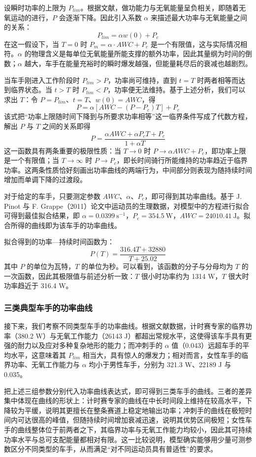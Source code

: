 \documentclass[11pt,a4paper]{ctexart}
\begin{document}
设瞬时功率的上限为 $P_{lim}$。根据文献，做功能力与无氧能量呈负相关，即随着无氧运动的进行，$P$ 会逐渐下降。因此引入系数 $\alpha$ 来描述最大功率与无氧能量之间的关系：
\[
P_{lim}=\alpha w(0)+P_c
\]
在这一假设下，当 $T=0$ 时 $P_m=\alpha \cdot AWC+P_c$ 是一个有限值，这与实际情况相符。$\alpha$ 的物理含义是每单位无氧能量所能支撑的额外功率，因此其量纲为时间的倒数；$\alpha$ 越大，车手在能量充裕时的瞬时爆发越强，但能量耗尽后的衰减也越剧烈。

当车手刚进入工作阶段时 $P_{lim}>P$，功率尚可维持，直到 $t=T$ 时两者相等而达到临界状态。当 $t>T$ 时 $P_{lim}<P$，功率便无法维持。基于上述分析，我们可以求出 $T$：令 $P=P_{lim}$、$t=T$、$w(0)=AWC$，得
\[
P=\alpha\left[AWC-(P-P_c)T\right]+P_c
\]
该式把“功率上限随时间下降到与所要求功率相等”这一临界条件写成了代数方程，解出 $P$ 与 $T$ 之间的关系即得
\[
P=\frac{\alpha AWC+\alpha P_c T+P_c}{1+\alpha T}
\]
这一函数具有两条重要的极限性质：当 $T\to 0$ 时 $P\to \alpha AWC+P_c$，即功率上限是一个有限值；当 $T\to\infty$ 时 $P\to P_c$，即长时间骑行所能维持的功率趋近于临界功率。这两条性质恰好刻画出功率曲线的两端行为，中间部分则表现为随持续时间增加而单调下降的过渡段。

对于给定的车手，只要测定参数 $AWC$、$\alpha$、$P_c$，即可得到其功率曲线。基于 J. Pinot 与 F. Grappe（2011）论文中运动员的生理数据，对模型中的方程进行拟合可得到最佳拟合结果，即 $\alpha=0.0399\ \mathrm{s^{-1}}$，$P_c=354.5\ \mathrm{W}$，$AWC=24010.41\ \mathrm{J}$。拟合所得的曲线即为该车手的功率曲线。

拟合得到的功率—持续时间函数为：
\[
P(T)=\frac{316.4T+32880}{T+25.02}
\]
其中 $P$ 的单位为瓦特，$T$ 的单位为秒。可以看到，该函数的分子与分母均为 $T$ 的一次函数，因此其极限值与前述分析一致：$T$ 很小时功率约为 1314 W，$T$ 很大时功率趋近于 316.4 W。

\subsubsection{三类典型车手的功率曲线}

接下来，我们考察不同类型车手的功率曲线。根据文献数据，计时赛专家的临界功率（380.2 W）与无氧工作能力（26143 J）都超出常规水平，这使得该车手具有更强的耐力以及应对多种复杂地形的能力；而冲刺手的 $\alpha$ 值（0.043）远超车手的平均水平，这意味着其 $P_{lim}$ 相当大，具有惊人的爆发力；相对而言，女性车手的临界功率、无氧工作能力与 $\alpha$ 均小于男性车手，分别为 321.3 W、22189 J 与 0.035。

把上述三组参数分别代入功率曲线表达式，即可得到三类车手的曲线。三者的差异集中体现在曲线的形状上：计时赛专家的曲线在中长时间段上维持在较高水平，下降较为平缓，说明其更擅长在整条赛道上稳定地输出功率；冲刺手的曲线在极短时间内可达很高的峰值，但随持续时间增加衰减迅速，说明其优势区间极短；女性车手的曲线整体位于前两者之下，其临界功率与无氧工作能力均较小，因此其可持续功率水平与总可支配能量都相对有限。这一比较说明，模型确实能够用少量可测参数区分不同类型的车手，从而满足“对不同运动员具有普适性”的要求。
\end{document}
